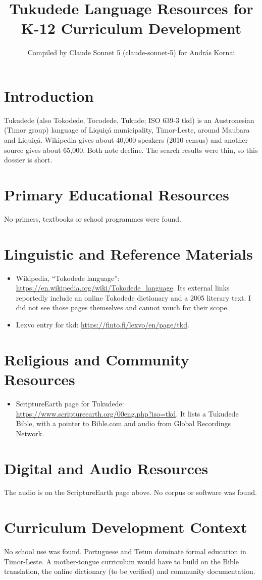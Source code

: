 \documentclass[12pt]{article}
\title{Tukudede Language Resources for K-12 Curriculum Development}
\author{Compiled by Claude Sonnet 5 (claude-sonnet-5) for Andr\'as Kornai}
\date{}
\begin{document}
\maketitle

\section{Introduction}
Tukudede (also Tokodede, Tocodede, Tukude; ISO 639-3 tkd) is an Austronesian (Timor group) language of Liqui\c{c}\'a municipality, Timor-Leste, around Maubara and Liqui\c{c}\'a. Wikipedia gives about 40,000 speakers (2010 census) and another source gives about 65,000. Both note decline. The search results were thin, so this dossier is short.

\section{Primary Educational Resources}
No primers, textbooks or school programmes were found.

\section{Linguistic and Reference Materials}
\begin{itemize}
\item Wikipedia, ``Tokodede language'': \url{https://en.wikipedia.org/wiki/Tokodede_language}. Its external links reportedly include an online Tokodede dictionary and a 2005 literary text. I did not see those pages themselves and cannot vouch for their scope.
\item Lexvo entry for tkd: \url{https://finto.fi/lexvo/en/page/tkd}.
\end{itemize}

\section{Religious and Community Resources}
\begin{itemize}
\item ScriptureEarth page for Tukudede: \url{https://www.scriptureearth.org/00eng.php?iso=tkd}. It lists a Tukudede Bible, with a pointer to Bible.com and audio from Global Recordings Network.
\end{itemize}

\section{Digital and Audio Resources}
The audio is on the ScriptureEarth page above. No corpus or software was found.

\section{Curriculum Development Context}
No school use was found. Portuguese and Tetun dominate formal education in Timor-Leste. A mother-tongue curriculum would have to build on the Bible translation, the online dictionary (to be verified) and community documentation.
\end{document}
